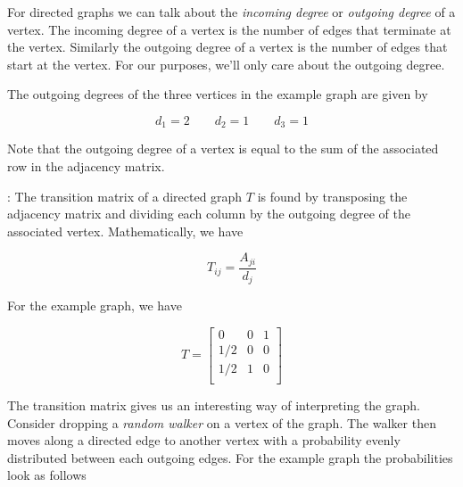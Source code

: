 \documentclass[12pt]{article}
\newcommand{\nin}{\noindent}
\newcommand{\vthree}{\vspace{3mm}}
\newcommand{\mymat}[1]{
\left[
\begin{array}{rrrrrrrrrrrrrrrrrrrrrrrrrrrrrrrrrrrrrrr}
#1
\end{array}
\right]
}
\begin{document}
\vthree

\nin For directed graphs we can talk about the {\it incoming degree} or {\it outgoing degree} of a vertex.  The incoming degree of a vertex is the number of edges that terminate at the vertex.  Similarly the outgoing degree of a vertex is the number of edges that start at the vertex.  For our purposes, we'll only care about the outgoing degree.

\vthree

\nin The outgoing degrees of the three vertices in the example graph are given by

\[
d_1 = 2 \quad \quad
d_2 = 1 \quad \quad
d_3 = 1
\]

\vthree

\nin Note that the outgoing degree of a vertex is equal to the sum of the associated row in the adjacency matrix.

\vthree

\nin {\bf Def}: The transition matrix of a directed graph $T$ is found by transposing the adjacency matrix and dividing each column by the outgoing degree of the associated vertex.  Mathematically, we have

\[
T_{ij} = \frac{A_{ji}}{d_j}
\]

\vthree

\nin For the example graph, we have

\[
T =
\mymat{
  0 & 0 & 1 \\
1/2 & 0 & 0 \\
1/2 & 1 & 0 \\
}
\]

\vthree

\nin The transition matrix gives us an interesting way of interpreting the graph.  Consider dropping a {\it random walker} on a vertex of the graph.  The walker then moves along a directed edge to another vertex with a probability evenly distributed between each outgoing edges.  For the example graph the probabilities look as follows

\vthree

\begin{center}
\end{center}
\end{document}

